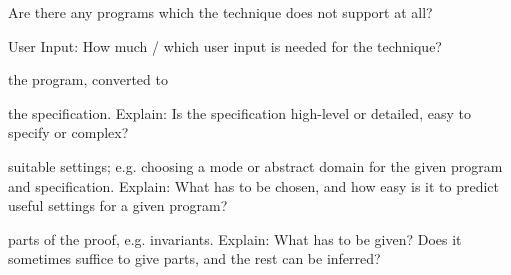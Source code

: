 \documentclass[a4paper]{article}
\begin{document}
\begin{minipage}[t]{0.16\linewidth}
\begin{betterlist}
\begin{betterlist}
\begin{betterlist}
			\end{betterlist}
			\item Are there any programs which the technique does not support at all?

		\end{betterlist}
		\item \alert{User Input:} How much / which user input is needed for the technique?
		\begin{betterlist}
			\item \checkboxChecked the program, converted to

			\item \checkboxHalfChecked the specification. Explain: Is the specification high-level or detailed, easy to specify or complex?

			\item \checkboxUnchecked suitable settings; e.g. choosing a mode or abstract domain for the given program and specification. Explain: What has to be chosen, and how easy is it to predict useful settings for a given program?

			\item \checkboxUnchecked parts of the proof, e.g. invariants. Explain: What has to be given? Does it sometimes suffice to give parts, and the rest can be inferred?


\end{betterlist}
\end{betterlist}
\end{minipage}
\end{document}
